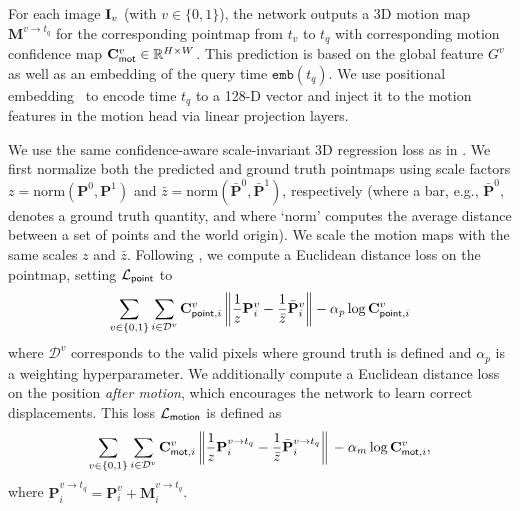 For each image $\mathbf{I}_v$ (with $v \in \{0,1\}$), the network outputs a 3D motion map $\mathbf{M}^{v\to t_q}$ for the corresponding pointmap from $t_v$ to $t_q$ with corresponding motion confidence map $\mathbf{C}_\mathsf{mot}^{v}\in\mathbb{R}^{H\times W}$. This prediction is based on the global feature $G^v$ as well as an embedding of the query time $\texttt{emb}(t_q)$. We use positional embedding~\cite{vaswani2017attention} to encode time $t_q$ to a 128-D vector and inject it to the motion features in the motion head via linear projection layers.

 We use the same confidence-aware scale-invariant 3D regression loss
as in \duster. 
We first normalize both the predicted and ground truth pointmaps using scale factors $z=\text{norm}(\mathbf{P}^0, \mathbf{P}^1)$ and $\bar{z}=\text{norm}(\bar{\mathbf{P}}^0, \bar{\mathbf{P}}^1)$, respectively (where a bar, e.g., $\bar{\mathbf{P}}^0$, denotes a ground truth quantity, and where `$\text{norm}$' computes the average distance between a set of points and the world origin). 
We scale the motion maps with the same scales $z$ and $\bar{z}$. 
Following \duster, we compute a Euclidean distance loss on the pointmap, setting $\mathcal{L}_\mathsf{point}$ to
{\small
\begin{equation}
    \sum_{v\in\{0,1\}}\sum_{i\in\mathcal{D}^v}\mathbf{C}_{\mathsf{point},i}^v\left\|\frac{1}{z}\mathbf{P}_i^v - \frac{1}{\bar{z}}\bar{\mathbf{P}}_i^v\right\| - \alpha_p\log\mathbf{C}_{\mathsf{point},i}^v
    \label{eqn:loss_point}
\end{equation}}
where $\mathcal{D}^v$ corresponds to the valid pixels where ground truth is defined and $\alpha_p$ is a weighting hyperparameter. 
We additionally compute a Euclidean distance loss on the position \emph{after motion}, which encourages the network to learn correct displacements. This loss $\mathcal{L}_\mathsf{motion}$ is defined as
{\small
\begin{equation}\label{eqn:loss_motion}
    \sum_{v\in\{0,1\}}\sum_{i\in\mathcal{D}^v}\mathbf{C}_{\mathsf{mot},i}^v\left\|\frac{1}{z}\mathbf{P}_i^{v\to t_q} - \frac{1}{\bar{z}}\bar{\mathbf{P}}_i^{v\to t_q}\right\| \\
    - \alpha_m\log\mathbf{C}_{\mathsf{mot},i}^v,
\end{equation}}
where $ \mathbf{P}_i^{v\to t_q} = \mathbf{P}_i^v + \mathbf{M}_i^{v\to t_q}$.

